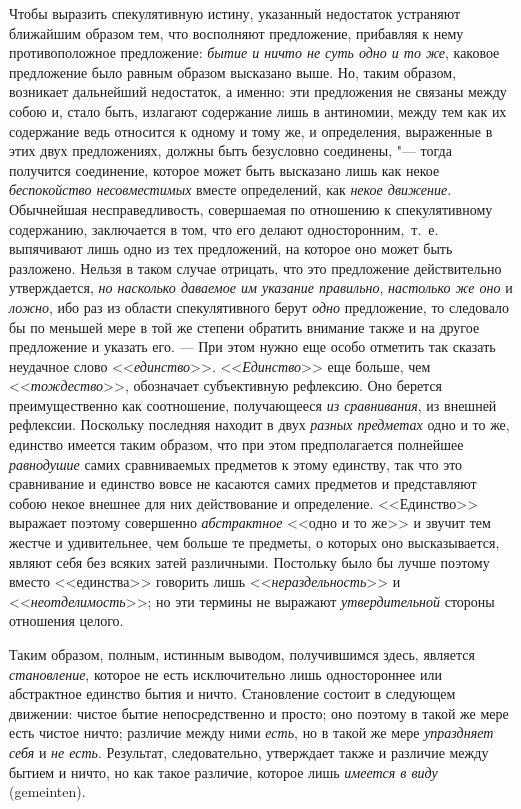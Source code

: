 Чтобы выразить спекулятивную истину, указанный недостаток устраняют
ближайшим образом тем, что восполняют предложение, прибавляя к нему
противоположное предложение: {\em бытие и ничто не суть
одно и то же}, каковое предложение было равным образом высказано выше. Но,
таким образом, возникает дальнейший недостаток, а именно: эти предложения
не связаны между собою и, стало быть, излагают содержание лишь в антиномии,
между тем как их содержание ведь относится к одному и тому же, и
определения, выраженные в этих двух предложениях, должны быть безусловно
соединены, "--- тогда получится соединение, которое может быть высказано лишь
как некое {\em беспокойство несовместимых} вместе
определений, как {\em некое движение}. Обычнейшая
несправедливость, совершаемая по отношению к спекулятивному содержанию,
заключается в том, что его делают односторонним,~т.~е. выпячивают лишь одно
из тех предложений, на которое оно может быть разложено. Нельзя в таком
случае отрицать, что это предложение действительно утверждается,
{\em но насколько даваемое им указание правильно},
{\em настолько же оно} и
{\em ложно}, ибо раз из области спекулятивного берут
{\em одно} предложение, то следовало бы по меньшей мере
в той же степени обратить внимание также и на другое предложение и указать
его. --- При этом нужно еще особо отметить так сказать неудачное слово
<<{\em единство}>>. <<{\em Единство}>>
еще больше, чем <<{\em тождество}>>, обозначает
субъективную рефлексию. Оно берется преимущественно как соотношение,
получающееся {\em из сравнивания}, из внешней
рефлексии. Поскольку последняя находит в двух
{\em разных предметах} одно и то же, единство имеется
таким образом, что при этом предполагается полнейшее
{\em равнодушие} самих сравниваемых предметов к этому
единству, так что это сравнивание и единство вовсе не касаются самих
предметов и представляют собою некое внешнее для них действование и
определение. <<Единство>> выражает поэтому совершенно
{\em абстрактное} <<одно и то же>> и звучит тем жестче и
удивительнее, чем больше те предметы, о которых оно высказывается, являют
себя без всяких затей различными. Постольку было бы лучше поэтому вместо
<<единства>> говорить лишь <<{\em нераздельность}>> и
<<{\em неотделимость}>>; но эти термины не выражают
{\em утвердительной} стороны отношения целого.

Таким образом, полным, истинным выводом, получившимся здесь, является
{\em становление}, которое не есть исключительно лишь
одностороннее или абстрактное единство бытия и ничто. Становление состоит в
следующем движении: чистое бытие непосредственно и просто; оно поэтому в
такой же мере есть чистое ничто; различие между ними
{\em есть}, но в такой же мере
{\em упраздняет себя} и {\em не
есть}. Результат, следовательно, утверждает также и различие между бытием и
ничто, но как такое различие, которое лишь {\em имеется
в виду} (gemeinten).

